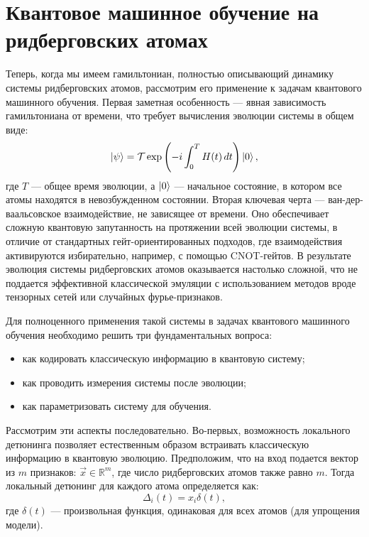 \section{Квантовое машинное обучение на ридберговских атомах}
\label{sec:Chapter2} 

Теперь, когда мы имеем гамильтониан, полностью описывающий динамику системы ридберговских атомов, рассмотрим его применение к задачам квантового машинного обучения. Первая заметная особенность --- явная зависимость гамильтониана от времени, что требует вычисления эволюции системы в общем виде:
\begin{equation}
    \ket{\psi} = \mathcal{T} \exp\left( -i \int_{0}^{T} H(t) \, dt \right) \ket{0},
\end{equation}
где $T$ --- общее время эволюции, а $\ket{0}$ --- начальное состояние, в котором все атомы находятся в невозбужденном состоянии. Вторая ключевая черта --- ван-дер-ваальсовское взаимодействие, не зависящее от времени. Оно обеспечивает сложную квантовую запутанность на протяжении всей эволюции системы, в отличие от стандартных гейт-ориентированных подходов, где взаимодействия активируются избирательно, например, с помощью CNOT-гейтов. В результате эволюция системы ридберговских атомов оказывается настолько сложной, что не поддается эффективной классической эмуляции с использованием методов вроде тензорных сетей или случайных фурье-признаков.

Для полноценного применения такой системы в задачах квантового машинного обучения необходимо решить три фундаментальных вопроса:
\begin{itemize}
\item как кодировать классическую информацию в квантовую систему;
\item как проводить измерения системы после эволюции;
\item как параметризовать систему для обучения.
\end{itemize}
Рассмотрим эти аспекты последовательно. Во-первых, возможность локального детюнинга позволяет естественным образом встраивать классическую информацию в квантовую эволюцию. Предположим, что на вход подается вектор из $m$ признаков: $\vec{x} \in \mathbb{R}^m$, где число ридберговских атомов также равно $m$. Тогда локальный детюнинг для каждого атома определяется как:
\begin{equation} \label{eqn:detuning_parametrisation}
    \Delta_i (t) = x_i \delta(t),
\end{equation}
где $\delta(t)$ --- произвольная функция, одинаковая для всех атомов (для упрощения модели).

